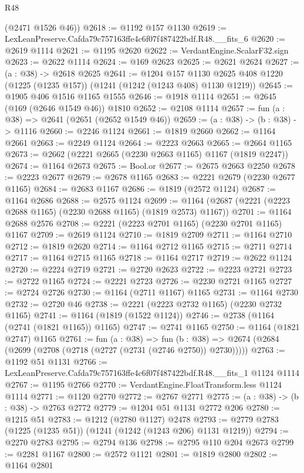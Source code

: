 \begin{lexlean}{R48}
\begin{coremodule}
      (@2471 @1526 @46))
@2618 := @1192 @157 @1130
@2619 := LexLeanPreserve.Cafda79c757163ffe4c6f07f487422bdf.R48.__fits_6
@2620 := @2619 @1114
@2621 := @1195 @2620
@2622 := VerdantEngine.ScalarF32.sign
@2623 := @2622 @1114
@2624 := @169 @2623
@2625 := @2621 @2624
@2627 := (a : @38) -> @2618 @2625
@2641 := @1204
    @157
    @1130
    @2625
    @408
    @1220
    (@1225 (@1235 @157))
    (@1241 (@1242 (@1243 @408) @1130 @1219))
@2645 := @1905 @406 @1516 @1165 @1555
@2646 := @1918 @1114
@2651 := @2645 (@169 (@2646 @1549 @46)) @1810
@2652 := @2108 @1114
@2657 := fun (a : @38) => @2641 (@2651 (@2652 @1549 @46))
@2659 := (a : @38) -> (b : @38) -> @1116
@2660 := @2246 @1124
@2661 := @1819 @2660
@2662 := @1164 @2661
@2663 := @2249 @1124
@2664 := @2223 @2663
@2665 := @2664 @1165
@2673 := @2662 (@2221 @2665 (@2230 @2663 @1165) @1167 (@1819 @2247))
@2674 := @1164 @2673
@2675 := Bool.or
@2677 := @2675 @2663 @2250
@2678 := @2223 @2677
@2679 := @2678 @1165
@2683 := @2221 @2679 (@2230 @2677 @1165)
@2684 := @2683 @1167
@2686 := @1819 (@2572 @1124)
@2687 := @1164 @2686
@2688 := @2575 @1124
@2699 := @1164 (@2687 (@2221 (@2223 @2688 @1165) (@2230 @2688 @1165) (@1819 @2573) @1167))
@2701 := @1164 @2688 @2576
@2708 := @2221 (@2223 @2701 @1165) (@2230 @2701 @1165) @1167
@2709 := @2619 @1124
@2710 := @1819 @2709
@2711 := @1164 @2710
@2712 := @1819 @2620
@2714 := @1164 @2712 @1165
@2715 := @2711 @2714
@2717 := @1164 @2715 @1165
@2718 := @1164 @2717
@2719 := @2622 @1124
@2720 := @2224 @2719
@2721 := @2720 @2623
@2722 := @2223 @2721
@2723 := @2722 @1165
@2724 := @2221 @2723
@2726 := @2230 @2721 @1165
@2727 := @2724 @2726
@2730 := @1164 (@2711 @1167) @1165
@2731 := @1164 @2730
@2732 := @2720 @46
@2738 := @2221 (@2223 @2732 @1165) (@2230 @2732 @1165)
@2741 := @1164 (@1819 (@1522 @1124))
@2746 := @2738 (@1164 (@2741 (@1821 @1165)) @1165)
@2747 := @2741 @1165
@2750 := @1164 (@1821 @2747) @1165
@2761 := fun (a : @38) =>
  fun (b : @38) => @2674 (@2684 (@2699 (@2708 (@2718 (@2727 (@2731 (@2746 @2750)) @2730)))))
@2763 := @1192 @51 @1131
@2766 := LexLeanPreserve.Cafda79c757163ffe4c6f07f487422bdf.R48.__fits_1 @1124 @1114
@2767 := @1195 @2766
@2770 := VerdantEngine.FloatTransform.less @1124 @1114
@2771 := @1120 @2770
@2772 := @2767 @2771
@2775 := (a : @38) -> (b : @38) -> @2763 @2772
@2779 := @1204 @51 @1131 @2772 @206
@2780 := @1215 @51
@2783 := @1212 (@2780 @1127) @2478
@2793 := @2779 @2783 (@1225 (@1235 @51)) (@1241 (@1242 (@1243 @206) @1131 @1219))
@2794 := @2270 @2783
@2795 := @2794 @136
@2798 := @2795 @110 @204 @2673
@2799 := @2281 @1167
@2800 := @2572 @1121
@2801 := @1819 @2800
@2802 := @1164 @2801

\end{coremodule}
\end{lexlean}
